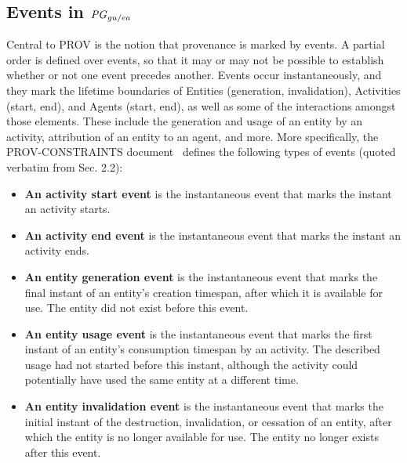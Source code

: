 \subsection{Events in $\mathit{PG}_{gu/ea}$}

\label{sec:events}

Central to PROV is the notion that provenance is marked by events. A partial order is defined over events, so that it may or may not be possible to establish whether or not one event precedes another. 
%
Events occur instantaneously, and they mark the lifetime boundaries of Entities (generation, invalidation), Activities (start, end), and Agents (start, end), as well as some of the interactions amongst those elements. These include the generation and usage of an entity by an activity, attribution of an entity to an agent, and more. More specifically, the PROV-CONSTRAINTS document~\citep{w3c-prov-constraints} defines the following types of events (quoted verbatim from Sec. 2.2):

\begin{itemize} %
	\item\textbf{An activity start event} is the instantaneous event that marks the instant an activity starts.
	
	\item\textbf{An activity end event} is the instantaneous event that marks the instant an activity ends.
	
	\item\textbf{An entity generation event} is the instantaneous event that marks the final instant of an entity's creation timespan, after which it is available for use. The entity did not exist before this event.
	
	\item\textbf{An entity usage event}  is the instantaneous event that marks the first instant of an entity's consumption timespan by an activity. The described usage had not started before this instant, although the activity could potentially have used the same entity at a different time.
	
	\item\textbf{An entity invalidation event} is the instantaneous event that marks the initial instant of the destruction, invalidation, or cessation of an entity, after which the entity is no longer available for use. The entity no longer exists after this event.
	
\end{itemize}

